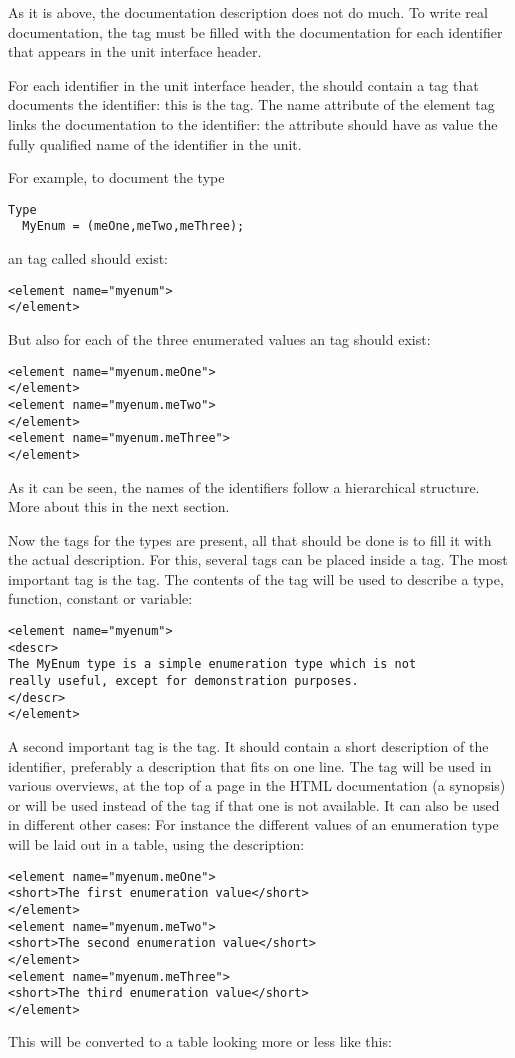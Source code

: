 As it is above, the documentation description does not do much. To write
real documentation, the  tag must be filled with the
documentation for each identifier that appears in the unit interface header.

For each identifier in the unit interface header, the  should
contain a tag that documents the identifier: this is the  tag.
The name attribute of the element tag links the documentation to the
identifier: the  attribute should have as value the fully
qualified name of the identifier in the unit.

For example, to document the type
\begin{verbatim}
Type
  MyEnum = (meOne,meTwo,meThree);
\end{verbatim}
an  tag called  should exist:
\begin{verbatim}
<element name="myenum">
</element>
\end{verbatim}
But also for each of the three enumerated values an  tag should 
exist:
\begin{verbatim}
<element name="myenum.meOne">
</element>
<element name="myenum.meTwo">
</element>
<element name="myenum.meThree">
</element>
\end{verbatim}
As it can be seen, the names of the identifiers follow a hierarchical
structure. More about this in the next section.

Now the tags for the types are present, all that should be done is to fill
it with the actual description.  For this, several tags can be placed inside
a  tag. The most important tag is the  tag. The
contents of the  tag will be used to describe a type, function, 
constant or variable:

\begin{verbatim}
<element name="myenum">
<descr>
The MyEnum type is a simple enumeration type which is not
really useful, except for demonstration purposes.
</descr>
</element>
\end{verbatim}

A second important tag is the  tag. It should contain a 
short description of the identifier, preferably a description that fits on
one line. The  tag will be used in
various overviews, at the top of a page in the HTML documentation (a
synopsis) or will be used instead of the  tag if that one 
is not available. It can also be used in different other cases: For 
instance the different values of an enumeration type will be laid 
out in a table, using the  description:
\begin{verbatim}
<element name="myenum.meOne">
<short>The first enumeration value</short>
</element>
<element name="myenum.meTwo">
<short>The second enumeration value</short>
</element>
<element name="myenum.meThree">
<short>The third enumeration value</short>
</element>
\end{verbatim}
This will be converted to a table looking more or less like this:

